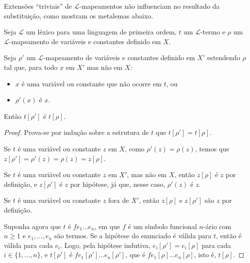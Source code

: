 Extensões ``triviais'' de $\mathcal L$-mapeamentos não influenciam no resultado da substituição, como mostram os metalemas abaixo.

\begin{metalemma}\label{mlem:substituicaoExtensaoTrivialEmTermos}
    Seja $\mathcal L$ um léxico para uma linguagem de primeira ordem, $t$ um $\mathcal L$-termo e $\rho$ um $\mathcal L$-mapeamento de variáveis e constantes definido em $X$.

    Seja $\rho'$ um $\mathcal L$-mapeamento de variáveis e constantes definido em $X'$ estendendo $\rho$ tal que, para todo $x$ em $X'$ mas não em $X$:
    \begin{itemize}
        \item $x$ é uma variável ou constante que não ocorre em $t$, ou
        \item $\rho'(x)$ é $x$.
    \end{itemize}

    Então $t[\rho']$ é $t[\rho]$.
\end{metalemma}
\begin{proof}
    Prova-se por indução sobre a estrutura de $t$ que $t[\rho']=t[\rho]$.

    Se $t$ é uma variável ou constante $z$ em $X$, como $\rho'(z)=\rho(z)$, temos que $z[\rho']=\rho'(z)=\rho(z)=z[\rho]$.

    Se $t$ é uma variável ou constante $z$ em $X'$, mas não em $X$, então $z[\rho]$ é $z$ por definição, e $z[\rho']$ é $z$ por hipótese, já que, nesse caso, $\rho'(z)$ é $z$.

    Se $t$ é uma variável ou constante $z$ fora de $X'$, então $z[\rho]$ e $z[\rho']$ são $z$ por definição.

    Suponha agora que $t$ é $fe_1 \dots e_n$, em que $f$ é um símbolo funcional $n$-ário com $n\geq 1$ e $e_1, \dots, e_n$ são termos.
    Se a hipótese do enunciado é válida para $t$, então é válida para cada $e_i$.
    Logo, pela hipótese indutiva, $e_i[\rho']=e_i[\rho]$ para cada $i\in\{1,\dots,n\}$, e $t[\rho']$ é $fe_1[\rho'] \dots e_n[\rho']$, que é $fe_1[\rho] \dots e_n[\rho]$, isto é, $t[\rho]$.
\end{proof}

